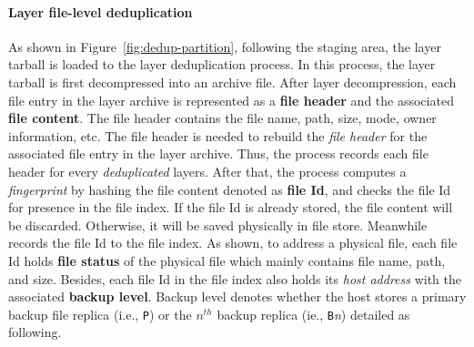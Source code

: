\paragraph{Layer file-level deduplication}
As shown in Figure~\ref{fig:dedup-partition}, 
following the staging area, the layer tarball is loaded to the layer deduplication process.
In this process, the layer tarball is first decompressed into an archive file.
After layer decompression, 
each file entry in the layer archive is represented as a \textbf{file header} and the associated \textbf{file content}.
The file header contains the file name, path, size, mode, owner information, etc.
The file header is needed to rebuild the \emph{file header} for 
the associated file entry in the layer archive.
Thus, 
the process records each file header for every \emph{deduplicated} layers. 
After that,
the process computes a \emph{fingerprint} by hashing the file content denoted as \textbf{file Id}, 
and checks the file Id for presence in the file index.
If the file Id is already stored, the file content will be discarded. 
Otherwise, it will be saved physically in file store.
Meanwhile
\sysname records the file Id to the file index.
As shown, %
%
to address a physical file, 
each file Id holds 
\textbf{file status} of the physical file which mainly contains file name, path, and size.
Besides, 
each file Id in the file index also holds its \emph{host address} with the associated \textbf{backup level}.
Backup level denotes whether the host stores a primary backup file replica (i.e., \texttt{P}) or the $n^{th}$ backup replica (ie., \texttt{B}\emph{n}) detailed as following.


